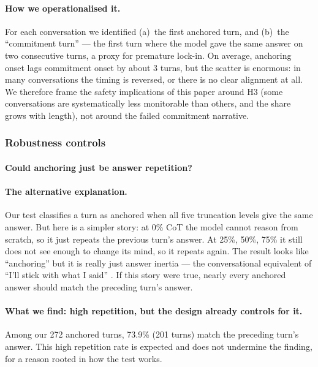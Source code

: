 \documentclass{article}
\begin{document}
\paragraph{How we operationalised it.}
For each conversation we identified (a)~the first anchored turn,
and (b)~the ``commitment turn'' --- the first turn where the model
gave the same answer on two consecutive turns, a proxy for
premature lock-in.
On average, anchoring onset lags commitment onset by about 3 turns,
but the scatter is enormous: in many conversations the timing
is reversed, or there is no clear alignment at all.
We therefore frame the safety implications of this paper around
H3 (some conversations are systematically less monitorable than
others, and the share grows with length), not around the failed
commitment narrative.


\subsubsection*{Robustness controls}

\paragraph{Could anchoring just be answer repetition?}
\label{subsec:repetition}

\paragraph{The alternative explanation.}
Our test classifies a turn as anchored when all five truncation
levels give the same answer.
But here is a simpler story: at 0\% CoT the model cannot reason
from scratch, so it just repeats the previous turn's answer.
At 25\%, 50\%, 75\% it still does not see enough to change its
mind, so it repeats again.
The result looks like ``anchoring'' but it is really just answer
inertia --- the conversational equivalent of ``I'll stick with
what I said'' \citep[a known multi-turn failure mode;][]{conv_inertia2026}.
If this story were true, nearly every anchored answer should match
the preceding turn's answer.

\paragraph{What we find: high repetition, but the design already controls for it.}
Among our 272 anchored turns, 73.9\% (201 turns) match the
preceding turn's answer.
This high repetition rate is expected and does not undermine the
finding, for a reason rooted in how the test works.
\end{document}

